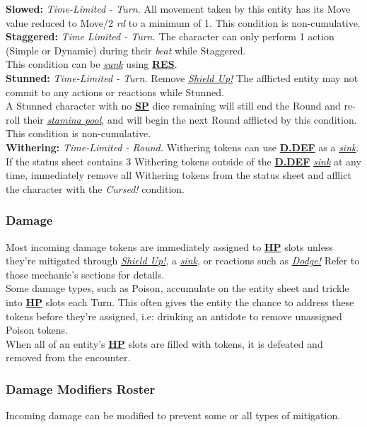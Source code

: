 \documentclass[12pt]{article}
\newcommand{\refto}[1]{\hyperlink{#1}{\textbf{#1}}}
\newcommand{\reftoit}[1]{\hyperlink{#1}{\emph{#1}}}
\begin{document}
\begin{multicols*}{2}
\textbf{Slowed:} \emph{Time-Limited - Turn.} All movement taken by this entity has its Move value reduced to Move/2 \emph{rd} to a minimum of 1. This condition is non-cumulative.\\

\textbf{Staggered:} \emph{Time Limited - Turn.} The character can only perform 1 action (Simple or Dynamic) during their \emph{beat} while Staggered.\\
This condition can be \reftoit{sunk} using \refto{RES}.\\

\textbf{Stunned:} \emph{Time-Limited - Turn.} Remove \reftoit{Shield Up!} The afflicted entity may not commit to any actions or reactions while Stunned.\\
A Stunned character with no \refto{SP} dice remaining will still end the Round and re-roll their \reftoit{stamina pool}, and will begin the next Round afflicted by this condition.\\
This condition is non-cumulative.\\

\textbf{Withering:} \emph{Time-Limited - Round.} Withering tokens can use \refto{D.DEF} as a \reftoit{sink}. If the status sheet contains 3 Withering tokens outside of the \refto{D.DEF} \reftoit{sink} at any time, immediately remove all Withering tokens from the status sheet and afflict the character with the \emph{Cursed!} condition.

\subsubsection{Damage}
Most incoming damage tokens are immediately assigned to \refto{HP} slots unless they’re mitigated through \reftoit{Shield Up!}, a \reftoit{sink}, or reactions such as \reftoit{Dodge!} Refer to those mechanic’s sections for details.\\
Some damage types, such as Poison, accumulate on the entity sheet and trickle into \refto{HP} slots each Turn. This often gives the entity the chance to address these tokens before they’re assigned, i.e: drinking an antidote to remove unassigned Poison tokens.\\
When all of an entity’s \refto{HP} slots are filled with tokens, it is defeated and removed from the encounter.

\subsubsection{Damage Modifiers Roster}
Incoming damage can be modified to prevent some or all types of mitigation.\\


\end{multicols*}
\end{document}
